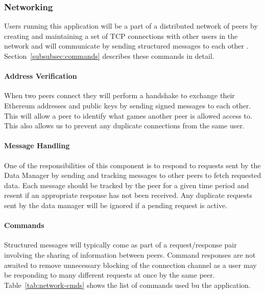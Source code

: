 \subsubsection{Networking}

Users running this application will be a part of a distributed network of peers by creating and maintaining a set of TCP connections with other users  in the network and will communicate by sending structured messages to each other . Section~\ref{subsubsec:commands} describes these commands in detail.

\paragraph*{Address Verification}
When two peers connect they will perform a handshake to exchange their Ethereum addresses and public keys by sending signed messages to each other. This will allow a peer to identify what games another peer is allowed access to. This also allows us to prevent any duplicate connections from the same user.

\paragraph*{Message Handling}

One of the responsibilities of this component is to respond to requests sent by the Data Manager by sending and tracking messages to other peers to fetch requested data. Each message should be tracked by the peer for a given time period and resent if an appropriate response has not been received. Any duplicate requests sent by the data manager will be ignored if a pending request is active. 

\paragraph*{Commands}\label{subsubsec:commands}

Structured messages  will typically come as part of a request/response pair involving the sharing of information between peers. Command responses are not awaited to remove unnecessary blocking of the connection channel as a user may be responding to many different requests at once by the same peer. Table~\ref{tab:network-cmds} shows the list of commands used bu the application.

